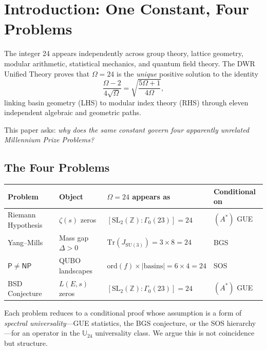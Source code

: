 \documentclass[11pt,a4paper]{article}
\theoremstyle{plain}
\theoremstyle{definition}
\theoremstyle{remark}
\begin{document}
\tableofcontents
\newpage

\section{Introduction: One Constant, Four Problems}

The integer 24 appears independently across group theory, lattice geometry, modular arithmetic, statistical mechanics, and quantum field theory. The DWR Unified Theory \cite{DWR2026} proves that $\Omega = 24$ is the \emph{unique} positive solution to the identity
\begin{equation}\label{eq:uniqueness}
\frac{\Omega - 2}{4\sqrt{\Omega}} = \sqrt{\frac{5\Omega + 1}{4\Omega}},
\end{equation}
linking basin geometry (LHS) to modular index theory (RHS) through eleven independent algebraic and geometric paths.

This paper asks: \emph{why does the same constant govern four apparently unrelated Millennium Prize Problems?}

\subsection{The Four Problems}

\begin{center}\small
\begin{tabular}{llll}
\toprule
Problem & Object & $\Omega = 24$ appears as & Conditional on \\
\midrule
Riemann Hypothesis & $\zeta(s)$ zeros & $[\text{SL}_2(\mathbb{Z}) : \Gamma_0(23)] = 24$ & $(A^*)$ GUE \\
Yang--Mills & Mass gap $\Delta > 0$ & $\text{Tr}(J_{\text{SU}(3)}) = 3 \times 8 = 24$ & BGS \\
$\mathsf{P} \neq \mathsf{NP}$ & QUBO landscapes & $\text{ord}(f) \times |\text{basins}| = 6 \times 4 = 24$ & SOS \\
BSD Conjecture & $L(E,s)$ zeros & $[\text{SL}_2(\mathbb{Z}) : \Gamma_0(23)] = 24$ & $(A^*)$ GUE \\
\bottomrule
\end{tabular}
\end{center}

Each problem reduces to a conditional proof whose assumption is a form of \emph{spectral universality}---GUE statistics, the BGS conjecture, or the SOS hierarchy---for an operator in the $\mathbb{U}_{24}$ universality class. We argue this is not coincidence but structure.
\end{document}
